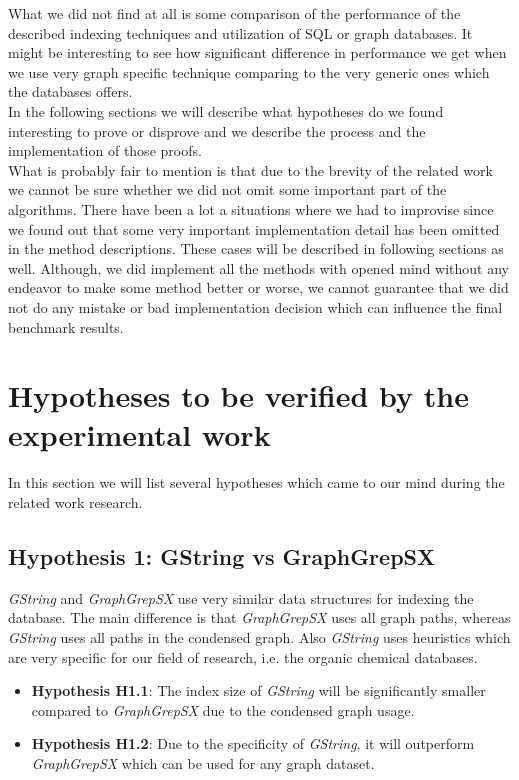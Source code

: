What we did not find at all is some comparison of the performance of the described indexing techniques and utilization of SQL or graph databases. It might be interesting to see how significant difference in performance we get when we use very graph specific technique comparing to the very generic ones which the databases offers.\\

In the following sections we will describe what hypotheses do we found interesting to prove or disprove and we describe the process and the implementation of those proofs.\\

What is probably fair to mention is that due to the brevity of the related work we cannot be sure whether we did not omit some important part of the algorithms. There have been a lot a situations where we had to improvise since we found out that some very important implementation detail has been omitted in the method descriptions. These cases will be described in following sections as well. Although, we did implement all the methods with opened mind without any endeavor to make some method better or worse, we cannot guarantee that we did not do any mistake or bad implementation decision which can influence the final benchmark results.

\section{Hypotheses to be verified by the experimental work}\label{hypotheses}

In this section we will list several hypotheses which came to our mind during the related work research.

\subsection{Hypothesis 1: GString vs GraphGrepSX}

\textit{GString} and \textit{GraphGrepSX} use very similar data structures for indexing the database. The main difference is that \textit{GraphGrepSX} uses all graph paths, whereas \textit{GString} uses all paths in the condensed graph. Also \textit{GString} uses heuristics which are very specific for our field of research, i.e. the organic chemical databases.\\

\begin{itemize}
	\item \textbf{Hypothesis H1.1}: The index size of \textit{GString} will be significantly smaller compared to \textit{GraphGrepSX} due to the condensed graph usage.
	\item \textbf{Hypothesis H1.2}:  Due to the specificity of \textit{GString}, it will outperform \textit{GraphGrepSX} which can be used for any graph dataset.
\end{itemize}

